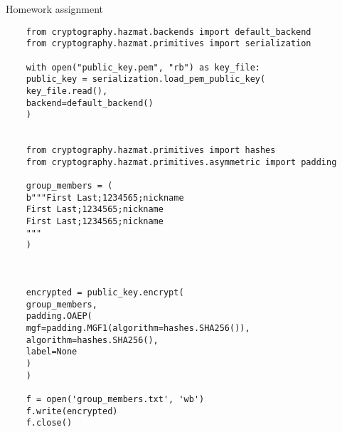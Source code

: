 \begin{frame}[fragile]{Homework assignment}
	
	\begin{verbatim}
	from cryptography.hazmat.backends import default_backend
	from cryptography.hazmat.primitives import serialization
	
	with open("public_key.pem", "rb") as key_file:
	public_key = serialization.load_pem_public_key(
	key_file.read(),
	backend=default_backend()
	)
	
	
	from cryptography.hazmat.primitives import hashes
	from cryptography.hazmat.primitives.asymmetric import padding
	
	group_members = (
	b"""First Last;1234565;nickname
	First Last;1234565;nickname
	First Last;1234565;nickname
	"""
	)
	
	
	
	encrypted = public_key.encrypt(
	group_members,
	padding.OAEP(
	mgf=padding.MGF1(algorithm=hashes.SHA256()),
	algorithm=hashes.SHA256(),
	label=None
	)
	)
	
	f = open('group_members.txt', 'wb')
	f.write(encrypted)
	f.close()
	\end{verbatim}
	
\end{frame}


